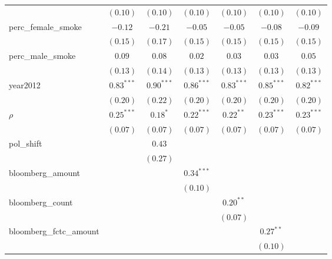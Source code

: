 \begin{table}[!h]
\begin{center}
\begin{tabular}{l c c c c c c }
                        & $(0.10)$     & $(0.10)$     & $(0.10)$     & $(0.10)$     & $(0.10)$     & $(0.10)$     \\
perc\_female\_smoke     & $-0.12$      & $-0.21$      & $-0.05$      & $-0.05$      & $-0.08$      & $-0.09$      \\
                        & $(0.15)$     & $(0.17)$     & $(0.15)$     & $(0.15)$     & $(0.15)$     & $(0.15)$     \\
perc\_male\_smoke       & $0.09$       & $0.08$       & $0.02$       & $0.03$       & $0.03$       & $0.05$       \\
                        & $(0.13)$     & $(0.14)$     & $(0.13)$     & $(0.13)$     & $(0.13)$     & $(0.13)$     \\
year2012                & $0.83^{***}$ & $0.90^{***}$ & $0.86^{***}$ & $0.83^{***}$ & $0.85^{***}$ & $0.82^{***}$ \\
                        & $(0.20)$     & $(0.22)$     & $(0.20)$     & $(0.20)$     & $(0.20)$     & $(0.20)$     \\
$\rho$                  & $0.25^{***}$ & $0.18^{*}$   & $0.22^{***}$ & $0.22^{**}$  & $0.23^{***}$ & $0.23^{***}$ \\
                        & $(0.07)$     & $(0.07)$     & $(0.07)$     & $(0.07)$     & $(0.07)$     & $(0.07)$     \\
pol\_shift              &              & $0.43$       &              &              &              &              \\
                        &              & $(0.27)$     &              &              &              &              \\
bloomberg\_amount       &              &              & $0.34^{***}$ &              &              &              \\
                        &              &              & $(0.10)$     &              &              &              \\
bloomberg\_count        &              &              &              & $0.20^{**}$  &              &              \\
                        &              &              &              & $(0.07)$     &              &              \\
bloomberg\_fctc\_amount &              &              &              &              & $0.27^{**}$  &              \\
                        &              &              &              &              & $(0.10)$     &              \\

\end{tabular}
\end{center}
\end{table}
